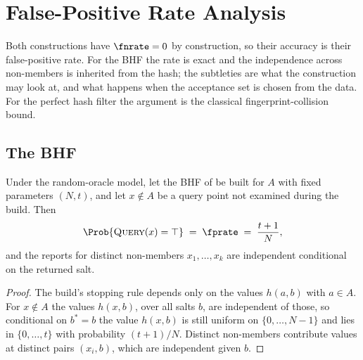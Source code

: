 %

\section{False-Positive Rate Analysis}
\label{sec:fpr-analysis}

Both constructions have $\fnrate = 0$ by construction, so their accuracy
is their false-positive rate. For the BHF the rate is exact and the
independence across non-members is inherited from the hash; the
subtleties are what the construction may look at, and what happens when
the acceptance set is chosen from the data. For the perfect hash filter
the argument is the classical fingerprint-collision bound.

\subsection*{The BHF}

\begin{proposition}
\label{prop:bhf-fpr}
Under the random-oracle model, let the BHF of  be built for
$A$ with fixed parameters $(N, t)$, and let $x \notin A$ be a query point
not examined during the build. Then
\[
  \Prob{\textsc{Query}(x) = \top} \;=\; \fprate \;=\; \frac{t + 1}{N},
\]
and the reports for distinct non-members $x_1, \ldots, x_k$ are
independent conditional on the returned salt.
\end{proposition}

\begin{proof}
The build's stopping rule depends only on the values $h(a, b)$ with $a
\in A$. For $x \notin A$ the values $h(x, b)$, over all salts $b$, are
independent of those, so conditional on $b^{*} = b$ the value $h(x, b)$ is
still uniform on $\{0, \ldots, N - 1\}$ and lies in $\{0, \ldots, t\}$
with probability $(t + 1)/N$. Distinct non-members contribute values at
distinct pairs $(x_i, b)$, which are independent given $b$.
\end{proof}

